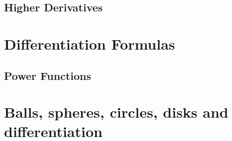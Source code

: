 {\subsection{Higher Derivatives}


\section{Differentiation Formulas}

\subsection{Power Functions}



\section{Balls, spheres, circles, disks and differentiation}
\youWillNotBeTested

}%

